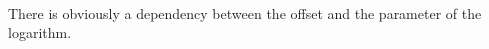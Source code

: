 \documentclass[11pt]{article}
\begin{document}
    \begin{center}
    \end{center}
    { \hspace*{\fill} \\}
    
    There is obviously a dependency between the offset and the parameter of
the logarithm.


    
    
    
\end{document}
